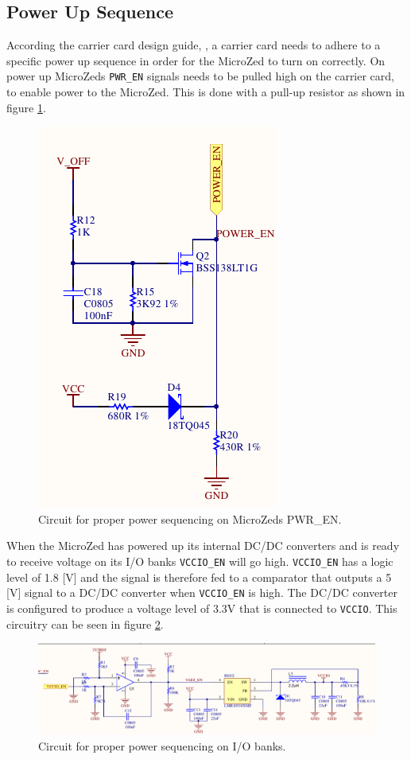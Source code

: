\subsection{Power Up Sequence}
According the carrier card design guide, \cite{design_carrier}, a carrier card needs to adhere to a specific power up sequence in order for the MicroZed to turn on correctly.
On power up MicroZeds \texttt{PWR\_EN} signals needs to be pulled high on the carrier card, to enable power to the MicroZed.
This is done with a pull-up resistor as shown in figure \ref{fig:pwr_en_circuit}.

\begin{figure}[h]
	\centering
	\includegraphics[width=.3\linewidth]{graphics/power_en_sch.pdf}
	\caption{Circuit for proper power sequencing on MicroZeds PWR\_EN.}
	\label{fig:pwr_en_circuit}
\end{figure}

When the MicroZed has powered up its internal DC/DC converters and is ready to receive voltage on its I/O banks \texttt{VCCIO\_EN} will go high.
\texttt{VCCIO\_EN} has a logic level of 1.8 [V] and the signal is therefore fed to a comparator that outputs a 5 [V] signal to a DC/DC converter when \texttt{VCCIO\_EN} is high.
The DC/DC converter is configured to produce a voltage level of 3.3V that is connected to \texttt{VCCIO}.
This circuitry can be seen in figure \ref{fig:pwr_io_circuit}.

\begin{figure}[h]
	\centering
	\includegraphics[width=1\linewidth]{graphics/vccio_power_up.pdf}
	\caption{Circuit for proper power sequencing on I/O banks.}
	\label{fig:pwr_io_circuit}
\end{figure}

